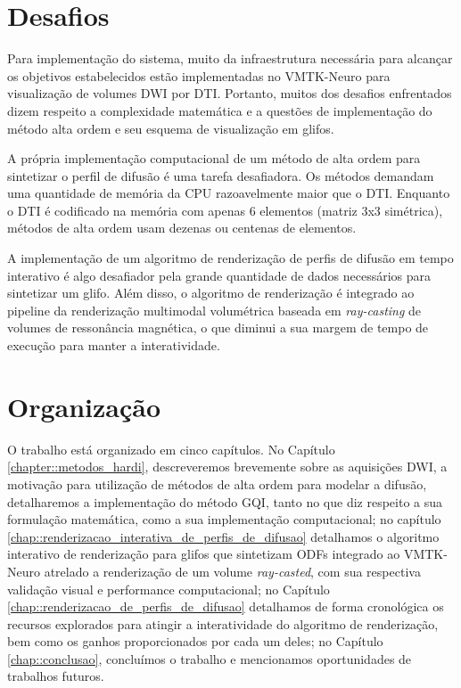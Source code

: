 \documentclass[
    12pt,                %
    oneside,            %
    a4paper,            %
    english,            %
    french,                %
    spanish,            %
    brazil                %
    ]{abntex2}
\begin{document}




\section{Desafios}
\label{sec::desafios}

Para implementação do sistema, muito da infraestrutura necessária para alcançar os objetivos estabelecidos estão implementadas no VMTK-Neuro para visualização de volumes DWI por DTI. Portanto, muitos dos desafios enfrentados dizem respeito a complexidade matemática e a questões de implementação do método alta ordem e seu esquema de visualização em glifos.

A própria implementação computacional de um método de alta ordem para sintetizar o perfil de difusão é uma tarefa desafiadora. Os métodos demandam uma quantidade de memória da CPU razoavelmente maior que o DTI. Enquanto o DTI é codificado na memória com apenas 6 elementos (matriz 3x3 simétrica), métodos de alta ordem usam dezenas ou centenas de elementos. %

A implementação de um algoritmo de renderização de perfis de difusão em tempo interativo é algo desafiador pela grande quantidade de dados necessários para sintetizar um glifo. Além disso, o algoritmo de renderização é integrado ao pipeline da renderização multimodal volumétrica baseada em \textit{ray-casting} de volumes de ressonância magnética, o que diminui a sua margem de tempo de execução para manter a interatividade.


\section{Organização}
\label{sec:intro_organizacao}

O trabalho está organizado em cinco capítulos. No Capítulo \ref{chapter::metodos_hardi}, descreveremos brevemente sobre as aquisições DWI, a motivação para utilização de métodos de alta ordem para modelar a difusão, detalharemos a implementação do método GQI, tanto no que diz respeito a sua formulação matemática, como a sua implementação computacional; no capítulo \ref{chap::renderizacao_interativa_de_perfis_de_difusao} detalhamos o algoritmo interativo de renderização para glifos que sintetizam ODFs integrado ao VMTK-Neuro atrelado a renderização de um volume \textit{ray-casted}, com sua respectiva validação visual e performance computacional; no Capítulo \ref{chap::renderizacao_de_perfis_de_difusao} detalhamos de forma cronológica os recursos explorados para atingir a interatividade do algoritmo de renderização, bem como os ganhos proporcionados por cada um deles; no Capítulo \ref{chap::conclusao}, concluímos o trabalho e mencionamos oportunidades de trabalhos futuros.
\end{document}
